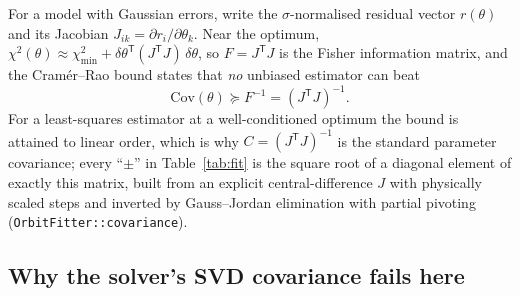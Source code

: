 For a model with Gaussian errors, write the $\sigma$-normalised residual
vector $r(\theta)$ and its Jacobian $J_{ik} = \partial r_i/\partial
\theta_k$. Near the optimum, $\chi^2(\theta) \approx \chi^2_{\min} +
\delta\theta^{\mathsf T}(J^{\mathsf T}J)\,\delta\theta$, so
$F = J^{\mathsf T}J$ is the Fisher information matrix, and the
Cram\'er--Rao bound states that \emph{no} unbiased estimator can beat
\begin{equation}
\mathrm{Cov}(\theta) \succeq F^{-1} = (J^{\mathsf T} J)^{-1}.
\label{eq:cramerrao}
\end{equation}
For a least-squares estimator at a well-conditioned optimum the bound is
attained to linear order, which is why $C = (J^{\mathsf T}J)^{-1}$ is
the standard parameter covariance; every ``$\pm$'' in
Table~\ref{tab:fit} is the square root of a diagonal element of exactly
this matrix, built from an explicit central-difference $J$ with
physically scaled steps and inverted by Gauss--Jordan elimination with
partial pivoting (\texttt{OrbitFitter::covariance}).

\subsection{Why the solver's SVD covariance fails here}
\label{sec:svdfail}

